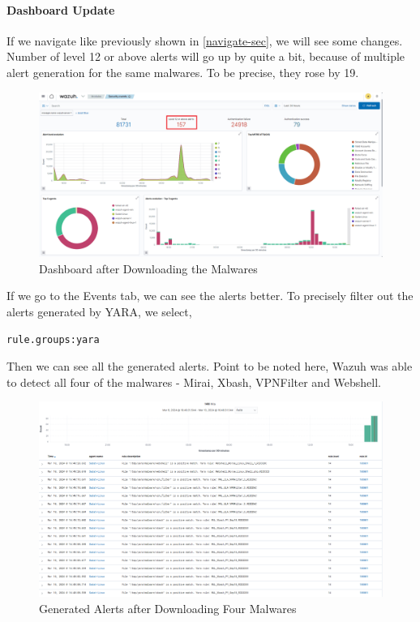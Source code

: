 \paragraph{Dashboard Update}
If we navigate like previously shown in \ref{navigate-sec}, we will see some changes. Number of level 12 or above alerts will go up by quite a bit, because of multiple alert generation for the same malwares. To be precise, they rose by 19. 
    \begin{figure}[H]
        \centering
        \includegraphics[width=\textwidth]{images/malware-detection/yara/6.png}
        \caption{Dashboard after Downloading the Malwares}
        \label{fig:yara-post-download}
    \end{figure}
If we go to the Events tab, we can see the alerts better. To precisely filter out the alerts generated by YARA, we select,
\begin{verbatim}
rule.groups:yara
\end{verbatim}
Then we can see all the generated alerts. Point to be noted here, Wazuh was able to detect all four of the malwares - Mirai, Xbash, VPNFilter and Webshell.
    \begin{figure}[H]
        \centering
        \includegraphics[width=\textwidth]{images/malware-detection/yara/7.png}
        \caption{Generated Alerts after Downloading Four Malwares}
        \label{fig:yara-alerts}
    \end{figure}

